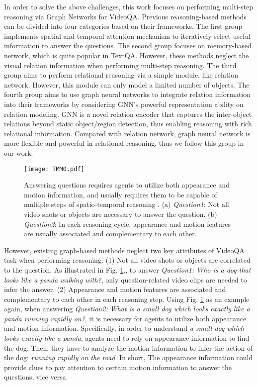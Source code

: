 \documentclass[journal]{IEEEtran}
\begin{document}
In order to solve the above challenges, this work focuses on performing multi-step reasoning via Graph Networks for VideoQA. Previous reasoning-based methods can be divided into four categories based on their frameworks. The first group \cite{li2019beyond, zhao2020open, zhao2019multi, zhao2019long} implements spatial and temporal attention mechanism to iteratively select useful information to answer the questions. The second group \cite{xu2017video, gao2018motion} focuses on memory-based network, which is quite popular in TextQA. However, these methods neglect the visual relation information when performing multi-step reasoning. The third group \cite{le2020hierarchical} aims to perform relational reasoning via a simple module, like relation network. However, this module can only model a limited number of objects. The fourth group \cite{huang2020location, jiang2020reasoning} aims to use graph neural networks to integrate relation information into their frameworks by considering GNN's powerful representation ability on relation modeling. GNN is a novel relation encoder that captures the inter-object relations beyond static object/region detection, thus enabling reasoning with rich relational information. Compared with relation network, graph neural network is more flexible and powerful in relational reasoning, thus we follow this group in our work.  
\begin{figure}[t]
    \centering
    \texttt{[image: TMM0.pdf]}
    \caption{Answering questions requires agents to utilize both appearance and motion information, and usually requires them to be capable of multiple steps of spatio-temporal reasoning \cite{xu2016msr}. (a) \textit{Question1}: Not all video shots or objects are necessary to answer the question. (b) \textit{Question2}: In each reasoning cycle, appearance and motion features are usually associated and complementary to each other.}
    \label{fig:Example}
\end{figure}

However, existing graph-based methods \cite{huang2020location, jiang2020reasoning} neglect two key attributes of VideoQA task when performing reasoning: (1) Not all video shots or objects are correlated to the question. As illustrated in Fig. \ref{fig:Example}., to answer \textit{Question1: Who is a dog that looks like a panda walking with?}, only question-related video clips are needed to infer the answer. (2) Appearance and motion features are associated and complementary to each other in each reasoning step. Using Fig. \ref{fig:Example} as an example again, when answering \textit{Question2: What is a small dog which looks exactly like a panda running rapidly on?}, it is necessary for agents to utilize both appearance and motion information. Specifically, in order to understand \textit{a small dog which looks exactly like a panda}, agents need to rely on appearance information to find the dog. Then, they have to analyze the motion information to infer the action of the dog: \textit{running rapidly on the road}. In short, The appearance information could provide clues to pay attention to certain motion information to answer the questions, vice versa.
\end{document}
